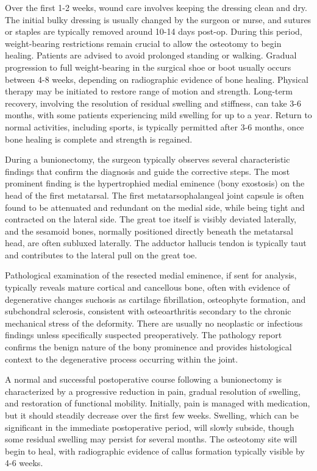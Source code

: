 Over the first 1-2 weeks, wound care involves keeping the dressing clean and dry. The initial bulky dressing is usually changed by the surgeon or nurse, and sutures or staples are typically removed around 10-14 days post-op. During this period, weight-bearing restrictions remain crucial to allow the osteotomy to begin healing. Patients are advised to avoid prolonged standing or walking. Gradual progression to full weight-bearing in the surgical shoe or boot usually occurs between 4-8 weeks, depending on radiographic evidence of bone healing. Physical therapy may be initiated to restore range of motion and strength. Long-term recovery, involving the resolution of residual swelling and stiffness, can take 3-6 months, with some patients experiencing mild swelling for up to a year. Return to normal activities, including sports, is typically permitted after 3-6 months, once bone healing is complete and strength is regained.

During a bunionectomy, the surgeon typically observes several characteristic findings that confirm the diagnosis and guide the corrective steps. The most prominent finding is the hypertrophied medial eminence (bony exostosis) on the head of the first metatarsal. The first metatarsophalangeal joint capsule is often found to be attenuated and redundant on the medial side, while being tight and contracted on the lateral side. The great toe itself is visibly deviated laterally, and the sesamoid bones, normally positioned directly beneath the metatarsal head, are often subluxed laterally. The adductor hallucis tendon is typically taut and contributes to the lateral pull on the great toe.

Pathological examination of the resected medial eminence, if sent for analysis, typically reveals mature cortical and cancellous bone, often with evidence of degenerative changes suchosis as cartilage fibrillation, osteophyte formation, and subchondral sclerosis, consistent with osteoarthritis secondary to the chronic mechanical stress of the deformity. There are usually no neoplastic or infectious findings unless specifically suspected preoperatively. The pathology report confirms the benign nature of the bony prominence and provides histological context to the degenerative process occurring within the joint.

A normal and successful postoperative course following a bunionectomy is characterized by a progressive reduction in pain, gradual resolution of swelling, and restoration of functional mobility. Initially, pain is managed with medication, but it should steadily decrease over the first few weeks. Swelling, which can be significant in the immediate postoperative period, will slowly subside, though some residual swelling may persist for several months. The osteotomy site will begin to heal, with radiographic evidence of callus formation typically visible by 4-6 weeks.

